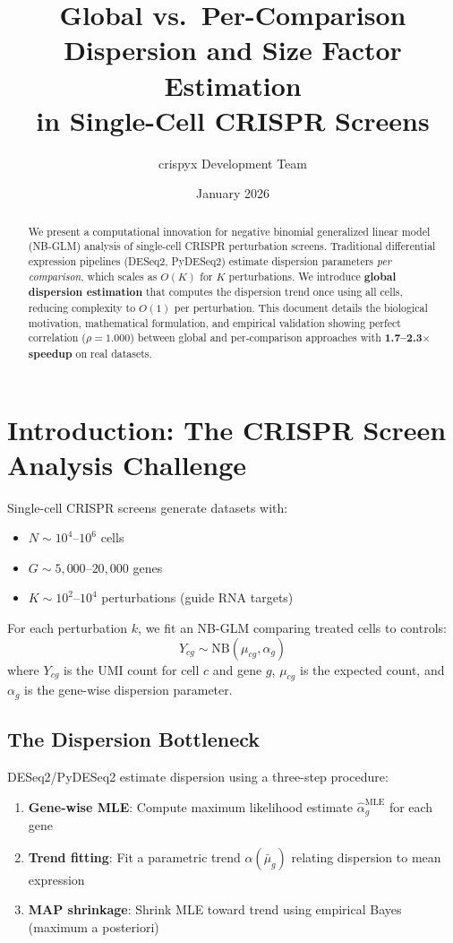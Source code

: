 \documentclass[11pt]{article}
\title{Global vs.\ Per-Comparison Dispersion and Size Factor Estimation\\in Single-Cell CRISPR Screens}
\author{crispyx Development Team}
\date{January 2026}
\theoremstyle{definition}
\theoremstyle{remark}
\begin{document}
\maketitle

\begin{abstract}
We present a computational innovation for negative binomial generalized linear model (NB-GLM) analysis of single-cell CRISPR perturbation screens. Traditional differential expression pipelines (DESeq2, PyDESeq2) estimate dispersion parameters \emph{per comparison}, which scales as $O(K)$ for $K$ perturbations. We introduce \textbf{global dispersion estimation} that computes the dispersion trend once using all cells, reducing complexity to $O(1)$ per perturbation. This document details the biological motivation, mathematical formulation, and empirical validation showing perfect correlation ($\rho = 1.000$) between global and per-comparison approaches with \textbf{1.7--2.3$\times$ speedup} on real datasets.
\end{abstract}

\tableofcontents
\newpage

\section{Introduction: The CRISPR Screen Analysis Challenge}

Single-cell CRISPR screens generate datasets with:
\begin{itemize}
    \item $N \sim 10^4$--$10^6$ cells
    \item $G \sim 5{,}000$--$20{,}000$ genes
    \item $K \sim 10^2$--$10^4$ perturbations (guide RNA targets)
\end{itemize}

For each perturbation $k$, we fit an NB-GLM comparing treated cells to controls:
\[
Y_{cg} \sim \text{NB}(\mu_{cg}, \alpha_g)
\]
where $Y_{cg}$ is the UMI count for cell $c$ and gene $g$, $\mu_{cg}$ is the expected count, and $\alpha_g$ is the gene-wise dispersion parameter.

\subsection{The Dispersion Bottleneck}

DESeq2/PyDESeq2 estimate dispersion using a three-step procedure:
\begin{enumerate}
    \item \textbf{Gene-wise MLE}: Compute maximum likelihood estimate $\hat{\alpha}_g^{\text{MLE}}$ for each gene
    \item \textbf{Trend fitting}: Fit a parametric trend $\alpha(\bar{\mu}_g)$ relating dispersion to mean expression
    \item \textbf{MAP shrinkage}: Shrink MLE toward trend using empirical Bayes (maximum a posteriori)
\end{enumerate}
\end{document}
